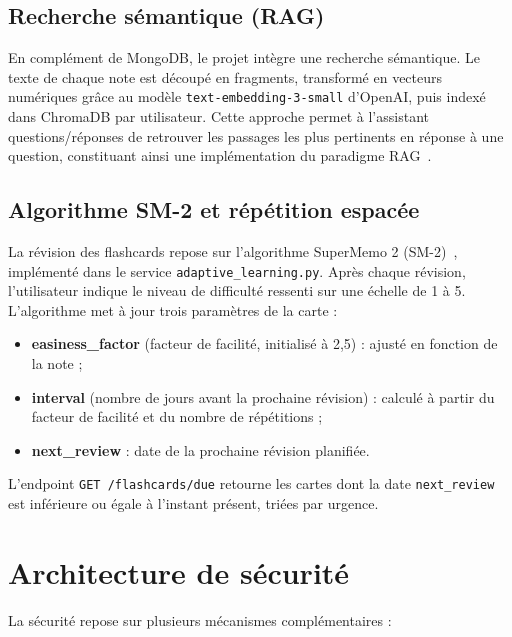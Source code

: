 \documentclass[12pt,a4paper]{report}
\begin{document}
\subsection{Recherche sémantique (RAG)}

En complément de MongoDB, le projet intègre une recherche sémantique. Le texte de chaque note est découpé en fragments, transformé en vecteurs numériques grâce au modèle \texttt{text-embedding-3-small} d'OpenAI, puis indexé dans ChromaDB par utilisateur. Cette approche permet à l'assistant questions/réponses de retrouver les passages les plus pertinents en réponse à une question, constituant ainsi une implémentation du paradigme RAG~\cite{lewis2020}.

\subsection{Algorithme SM-2 et répétition espacée}

La révision des flashcards repose sur l'algorithme SuperMemo 2 (SM-2)~\cite{wozniak1990}, implémenté dans le service \texttt{adaptive\_learning.py}. Après chaque révision, l'utilisateur indique le niveau de difficulté ressenti sur une échelle de 1 à 5. L'algorithme met à jour trois paramètres de la carte :

\begin{itemize}[label=--]
    \item \textbf{easiness\_factor} (facteur de facilité, initialisé à 2,5) : ajusté en fonction de la note ;
    \item \textbf{interval} (nombre de jours avant la prochaine révision) : calculé à partir du facteur de facilité et du nombre de répétitions ;
    \item \textbf{next\_review} : date de la prochaine révision planifiée.
\end{itemize}

L'endpoint \texttt{GET /flashcards/due} retourne les cartes dont la date \texttt{next\_review} est inférieure ou égale à l'instant présent, triées par urgence.

\section{Architecture de sécurité}

La sécurité repose sur plusieurs mécanismes complémentaires :
\end{document}

